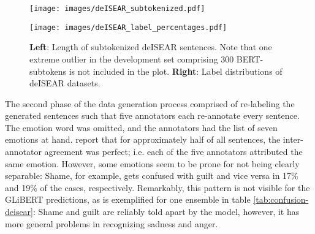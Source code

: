 \begin{figure}
  \begin{minipage}{0.45\linewidth}
  \vspace{0pt}
    \texttt{[image: images/deISEAR\_subtokenized.pdf]}
  \end{minipage}
  \hfill
  \begin{minipage}{0.45\linewidth}
  \vspace{0pt}
    \texttt{[image: images/deISEAR\_label\_percentages.pdf]}
  \end{minipage}
  \caption[XNLI Lengths]{\textbf{Left}: Length of subtokenized deISEAR sentences. Note that one extreme outlier in the
                          development set comprising 300 BERT-subtokens is not included in the plot. \textbf{Right}: Label distributions of deISEAR datasets.}
  \label{fig:deisear-stats}
\end{figure}

The second phase of the data generation process comprised of re-labeling the generated sentences
such that five annotators each re-annotate every sentence. The emotion word was omitted, and
the annotators had the list of seven emotions at hand. \citeauthor{troiano2019crowdsourcing}
report that for approximately half of all sentences, the inter-annotator agreement was perfect;
i.e. each of the five annotators attributed the same emotion. However, some emotions seem to
be prone for not being clearly separable: Shame, for example, gets confused with guilt and vice versa
in 17\% and 19\% of the cases, respectively. Remarkably, this pattern is not visible for the GLiBERT
predictions, as is exemplified for one ensemble in table \ref{tab:confusion-deisear}: Shame and guilt
are reliably told apart by the model, however, it has more general problems in recognizing
sadness and anger.

